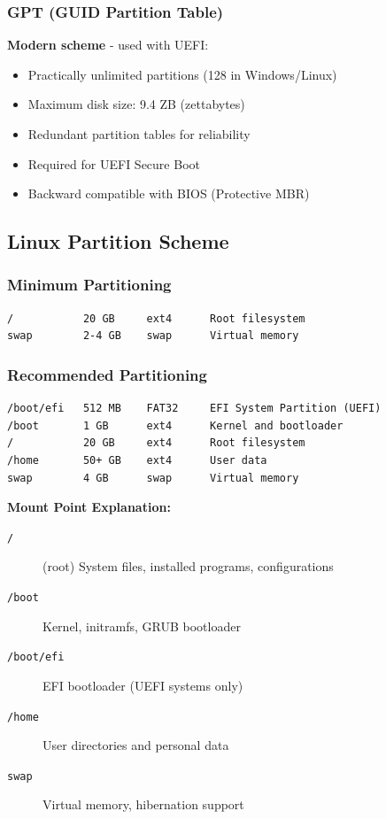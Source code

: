 \subsubsection{GPT (GUID Partition Table)}

\textbf{Modern scheme} - used with UEFI:
\begin{itemize}
    \item Practically unlimited partitions (128 in Windows/Linux)
    \item Maximum disk size: 9.4 ZB (zettabytes)
    \item Redundant partition tables for reliability
    \item Required for UEFI Secure Boot
    \item Backward compatible with BIOS (Protective MBR)
\end{itemize}

\subsection{Linux Partition Scheme}

\subsubsection{Minimum Partitioning}

\begin{lstlisting}[caption={Minimal partition scheme}]
/           20 GB     ext4      Root filesystem
swap        2-4 GB    swap      Virtual memory
\end{lstlisting}

\subsubsection{Recommended Partitioning}

\begin{lstlisting}[caption={Recommended partition scheme}]
/boot/efi   512 MB    FAT32     EFI System Partition (UEFI)
/boot       1 GB      ext4      Kernel and bootloader
/           20 GB     ext4      Root filesystem
/home       50+ GB    ext4      User data
swap        4 GB      swap      Virtual memory
\end{lstlisting}

\textbf{Mount Point Explanation:}

\begin{description}
    \item[\texttt{/}] (root) System files, installed programs, configurations
    \item[\texttt{/boot}] Kernel, initramfs, GRUB bootloader
    \item[\texttt{/boot/efi}] EFI bootloader (UEFI systems only)
    \item[\texttt{/home}] User directories and personal data
    \item[\texttt{swap}] Virtual memory, hibernation support
\end{description}

